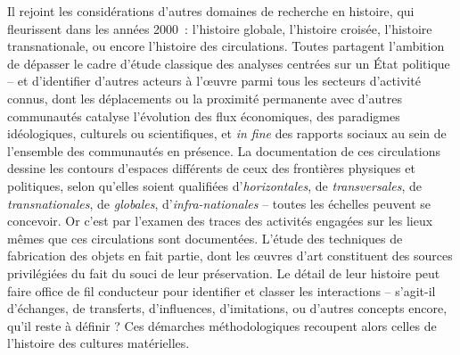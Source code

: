 \documentclass[a4paper,12pt, twoside]{book}
\begin{document}
Il rejoint les considérations d’autres domaines de recherche en histoire, qui fleurissent dans les années 2000~: l’histoire globale, l’histoire croisée, l’histoire transnationale, ou encore l’histoire des circulations. Toutes partagent l’ambition de dépasser le cadre d’étude classique des analyses centrées sur un État politique – et d’identifier d’autres acteurs à l’œuvre parmi tous les secteurs d’activité connus, dont les déplacements ou la proximité permanente avec d’autres communautés catalyse l’évolution des flux économiques, des paradigmes idéologiques, culturels ou scientifiques, et \textit{in fine} des rapports sociaux au sein de l’ensemble des communautés en présence. La documentation de ces circulations dessine les contours d’espaces différents de ceux des frontières physiques et politiques, selon qu’elles soient qualifiées d’\textit{horizontales}, de \textit{transversales}, de \textit{transnationales}, de \textit{globales}, d’\textit{infra-nationales} – toutes les échelles peuvent se concevoir. Or c’est par l’examen des traces des activités engagées sur les lieux mêmes que ces circulations sont documentées. L’étude des techniques de fabrication des objets en fait partie, dont les œuvres d’art constituent des sources privilégiées du fait du souci de leur préservation. Le détail de leur histoire peut faire office de fil conducteur pour identifier et classer les interactions – s’agit-il d’échanges, de transferts, d’influences, d’imitations, ou d’autres concepts encore, qu’il reste à définir ? Ces démarches méthodologiques recoupent alors celles de l’histoire des cultures matérielles.
\end{document}
